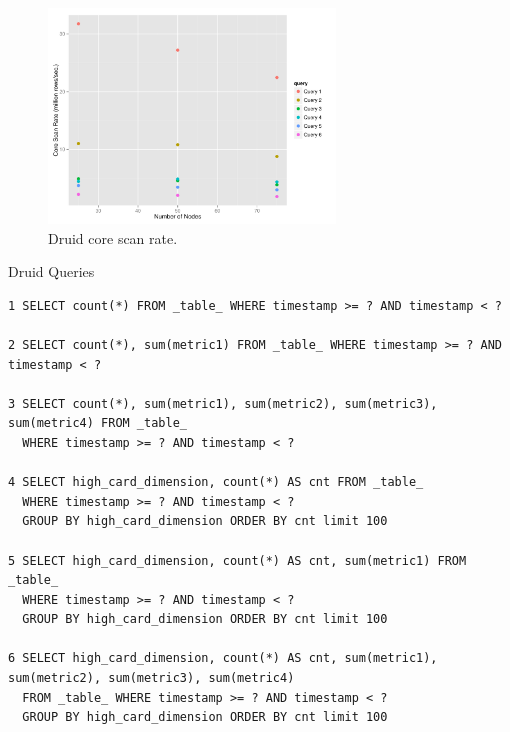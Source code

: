 \documentclass{vldb}
\begin{document}
\begin{figure}
\centering
\includegraphics[width = 3in]{core_scan_rate}
\caption{Druid core scan rate.}
\label{fig:core_scan_rate}
\end{figure}

\begin{table}
  \centering
  \caption{Druid Queries}
  \label{tab:sql_queries}
\begin{verbatim}
1 SELECT count(*) FROM _table_ WHERE timestamp >= ? AND timestamp < ?

2 SELECT count(*), sum(metric1) FROM _table_ WHERE timestamp >= ? AND timestamp < ?

3 SELECT count(*), sum(metric1), sum(metric2), sum(metric3), sum(metric4) FROM _table_
  WHERE timestamp >= ? AND timestamp < ?

4 SELECT high_card_dimension, count(*) AS cnt FROM _table_
  WHERE timestamp >= ? AND timestamp < ?
  GROUP BY high_card_dimension ORDER BY cnt limit 100

5 SELECT high_card_dimension, count(*) AS cnt, sum(metric1) FROM _table_
  WHERE timestamp >= ? AND timestamp < ?
  GROUP BY high_card_dimension ORDER BY cnt limit 100

6 SELECT high_card_dimension, count(*) AS cnt, sum(metric1), sum(metric2), sum(metric3), sum(metric4)
  FROM _table_ WHERE timestamp >= ? AND timestamp < ?
  GROUP BY high_card_dimension ORDER BY cnt limit 100
\end{verbatim}
\end{table}

\end{document}
